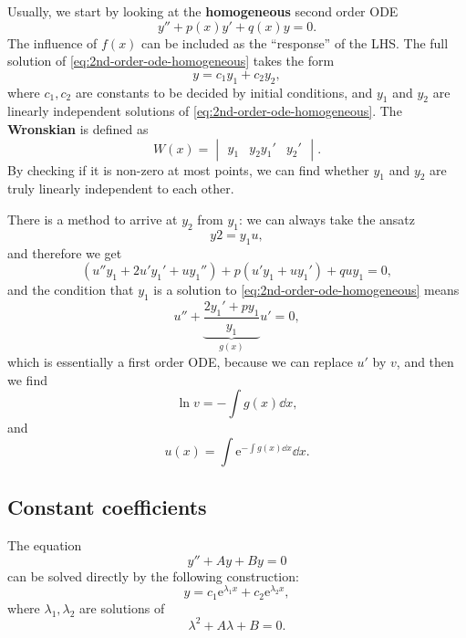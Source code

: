 \documentclass[hyperref, a4paper]{article}
\newcommand*{\ee}{\mathrm{e}}
\newcommand*{\concept}[1]{{\textbf{#1}}}
\def\\{}%
\begin{document}
Usually, we start by looking at 
the \concept{homogeneous} second order ODE 
\begin{equation}
    y'' + p(x) y' + q(x) y = 0.
    \label{eq:2nd-order-ode-homogeneous}
\end{equation}
The influence of $f(x)$ can be included as the 
``response'' of the LHS.
The full solution of \eqref{eq:2nd-order-ode-homogeneous}
takes the form 
\begin{equation}
    y = c_1 y_1 + c_2 y_2,
\end{equation}
where $c_1, c_2$ are constants to be decided 
by initial conditions,
and $y_1$ and $y_2$ are linearly independent solutions 
of \eqref{eq:2nd-order-ode-homogeneous}.
The \concept{Wronskian} is defined as 
\begin{equation}
    W(x) = 
    \begin{vmatrix}
        y_1 & y_2 \\ y_1' & y_2'
    \end{vmatrix}.
\end{equation} 
By checking if it is non-zero at most points,
we can find whether $y_1$ and $y_2$ are truly linearly independent to each other.

There is a method to arrive at $y_2$ from $y_1$:
we can always take the ansatz 
\begin{equation}
    y2 = y_1 u, 
\end{equation}
and therefore we get 
\[
    (u'' y_1 + 2 u' y_1' + u y_1'')
    + p (u' y_1 + u y_1')
    + q u y_1 = 0,
\]
and the condition that $y_1$ is a solution to 
\eqref{eq:2nd-order-ode-homogeneous} means 
\begin{equation}
    u'' + \underbrace{\frac{2y_1' + p y_1}{y_1}}_{g(x)} u' = 0,
\end{equation}
which is essentially a first order ODE, 
because we can replace $u'$ by $v$,
and then we find 
\[
    \ln v = - \int g(x) \dd{x},
\]
and 
\begin{equation}
    u(x) = \int \ee^{- \int g(x) \dd{x}} \dd{x}.
\end{equation}

\subsection{Constant coefficients}

The equation 
\begin{equation}
    y'' + A y + By = 0
\end{equation}
can be solved directly by the following construction:
\begin{equation}
    y = c_1 \ee^{\lambda_1 x} + c_2 \ee^{\lambda_2 x},
\end{equation}
where $\lambda_1, \lambda_2$ are solutions of 
\begin{equation}
    \lambda^2 + A \lambda + B = 0.
    \label{eq:character-eq}
\end{equation}
\end{document}
